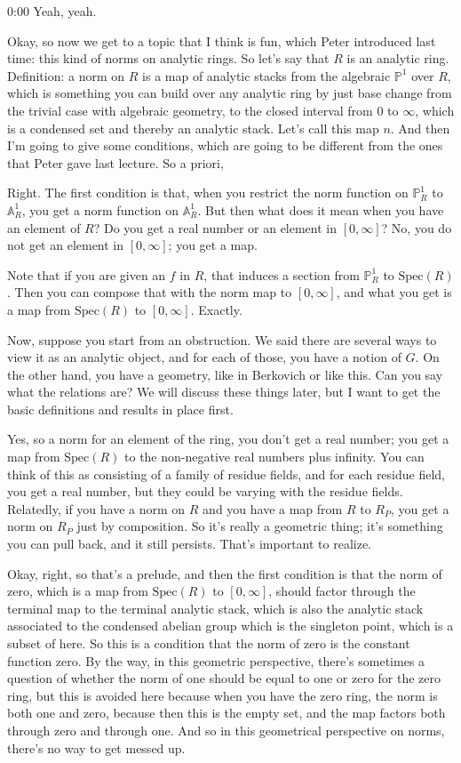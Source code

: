 \begin{unfinished}{0:00}
Yeah, yeah.

Okay, so now we get to a topic that I think is fun, which Peter introduced last time: this kind of norms on analytic rings. So let's say that $R$ is an analytic ring. Definition: a norm on $R$ is a map of analytic stacks from the algebraic $\mathbb{P}^1$ over $R$, which is something you can build over any analytic ring by just base change from the trivial case with algebraic geometry, to the closed interval from $0$ to $\infty$, which is a condensed set and thereby an analytic stack. Let's call this map $n$. And then I'm going to give some conditions, which are going to be different from the ones that Peter gave last lecture. So a priori,

Right. The first condition is that, when you restrict the norm function on $\mathbb{P}^1_R$ to $\mathbb{A}^1_R$, you get a norm function on $\mathbb{A}^1_R$. But then what does it mean when you have an element of $R$? Do you get a real number or an element in $[0, \infty]$? No, you do not get an element in $[0, \infty]$; you get a map.

Note that if you are given an $f$ in $R$, that induces a section from $\mathbb{P}^1_R$ to $\mathrm{Spec}(R)$. Then you can compose that with the norm map to $[0, \infty]$, and what you get is a map from $\mathrm{Spec}(R)$ to $[0, \infty]$. Exactly.

Now, suppose you start from an obstruction. We said there are several ways to view it as an analytic object, and for each of those, you have a notion of $G$. On the other hand, you have a geometry, like in Berkovich or like this. Can you say what the relations are? We will discuss these things later, but I want to get the basic definitions and results in place first.

Yes, so a norm for an element of the ring, you don't get a real number; you get a map from $\mathrm{Spec}(R)$ to the non-negative real numbers plus infinity. You can think of this as consisting of a family of residue fields, and for each residue field, you get a real number, but they could be varying with the residue fields. Relatedly, if you have a norm on $R$ and you have a map from $R$ to $R_P$, you get a norm on $R_P$ just by composition. So it's really a geometric thing; it's something you can pull back, and it still persists. That's important to realize.

Okay, right, so that's a prelude, and then the first condition is that the norm of zero, which is a map from $\mathrm{Spec}(R)$ to $[0, \infty]$, should factor through the terminal map to the terminal analytic stack, which is also the analytic stack associated to the condensed abelian group which is the singleton point, which is a subset of here. So this is a condition that the norm of zero is the constant function zero. By the way, in this geometric perspective, there's sometimes a question of whether the norm of one should be equal to one or zero for the zero ring, but this is avoided here because when you have the zero ring, the norm is both one and zero, because then this is the empty set, and the map factors both through zero and through one. And so in this geometrical perspective on norms, there's no way to get messed up.


\end{unfinished}
